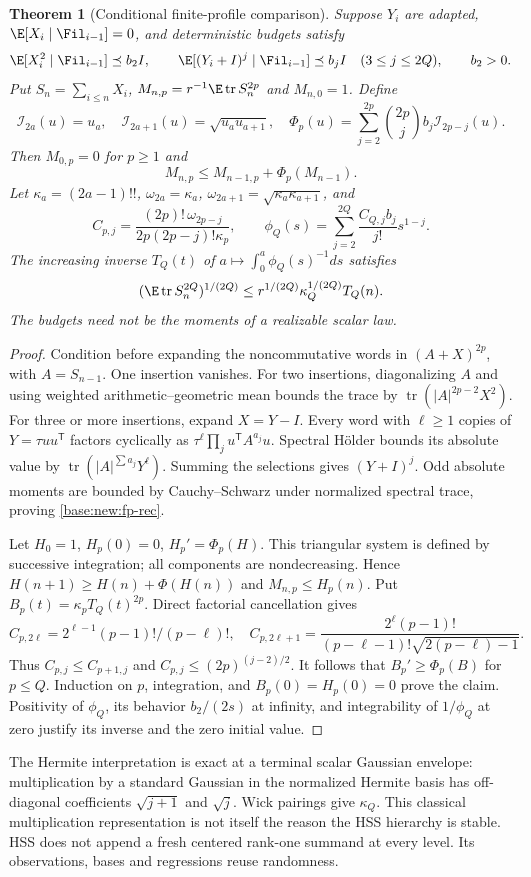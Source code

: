 \documentclass[11pt,oneside,openany,a4paper]{book}
\numberwithin{equation}{chapter}
\newtheorem{theorem}{Theorem}[chapter]
\theoremstyle{definition}
\theoremstyle{remark}
\newcommand{\T}{\mathsf T}\newcommand{\Id}{I}
\DeclareMathOperator{\tr}{tr}\DeclareMathOperator{\rank}{rank}
\begin{document}
\begin{theorem}[Conditional finite-profile comparison]\label{base:new:fp-thm}
Suppose $Y_i$ are adapted, $\E[X_i\mid\Fil_{i-1}]=0$, and deterministic budgets satisfy
\[
 \E[X_i^2\mid\Fil_{i-1}]\preceq b_2I,\qquad
 \E[(Y_i+I)^j\mid\Fil_{i-1}]\preceq b_jI\quad(3\le j\le2Q),
 \qquad b_2>0.
\]
Put $S_n=\sum_{i\le n}X_i$, $M_{n,p}=r^{-1}\E\tr S_n^{2p}$ and $M_{n,0}=1$. Define
\[
 \mathcal I_{2a}(u)=u_a,\quad \mathcal I_{2a+1}(u)=\sqrt{u_au_{a+1}},\quad
 \Phi_p(u)=\sum_{j=2}^{2p}\binom{2p}j b_j\mathcal I_{2p-j}(u).
\]
Then $M_{0,p}=0$ for $p\ge1$ and
\begin{equation}\label{base:new:fp-rec}
 M_{n,p}\le M_{n-1,p}+\Phi_p(M_{n-1}).
\end{equation}
Let $\kappa_a=(2a-1)!!$, $\omega_{2a}=\kappa_a$, $\omega_{2a+1}=\sqrt{\kappa_a\kappa_{a+1}}$, and
\[
 C_{p,j}=\frac{(2p)!\,\omega_{2p-j}}{2p(2p-j)!\kappa_p},\qquad
 \phi_Q(s)=\sum_{j=2}^{2Q}\frac{C_{Q,j}b_j}{j!}s^{1-j}.
\]
The increasing inverse $T_Q(t)$ of $a\mapsto\int_0^a\phi_Q(s)^{-1}ds$ satisfies
\begin{equation}\label{base:new:fp-int}
 (\E\tr S_n^{2Q})^{1/(2Q)}\le r^{1/(2Q)}\kappa_Q^{1/(2Q)}T_Q(n).
\end{equation}
The budgets need not be the moments of a realizable scalar law.
\end{theorem}
\begin{proof}
Condition before expanding the noncommutative words in $(A+X)^{2p}$, with $A=S_{n-1}$. One insertion vanishes. For two insertions, diagonalizing $A$ and using weighted arithmetic--geometric mean bounds the trace by $\tr(|A|^{2p-2}X^2)$. For three or more insertions, expand $X=Y-I$. Every word with $\ell\ge1$ copies of $Y=\tau uu^\T$ factors cyclically as $\tau^\ell\prod_j u^\T A^{a_j}u$. Spectral H\"older bounds its absolute value by $\tr(|A|^{\sum a_j}Y^\ell)$. Summing the selections gives $(Y+I)^j$. Odd absolute moments are bounded by Cauchy--Schwarz under normalized spectral trace, proving \eqref{base:new:fp-rec}.

Let $H_0=1$, $H_p(0)=0$, $H_p'=\Phi_p(H)$. This triangular system is defined by successive integration; all components are nondecreasing. Hence $H(n+1)\ge H(n)+\Phi(H(n))$ and $M_{n,p}\le H_p(n)$. Put $B_p(t)=\kappa_pT_Q(t)^{2p}$. Direct factorial cancellation gives
\[
 C_{p,2\ell}=2^{\ell-1}(p-1)!/(p-\ell)!,\quad
 C_{p,2\ell+1}=\frac{2^\ell(p-1)!}{(p-\ell-1)!\sqrt{2(p-\ell)-1}}.
\]
Thus $C_{p,j}\le C_{p+1,j}$ and $C_{p,j}\le(2p)^{(j-2)/2}$. It follows that $B_p'\ge\Phi_p(B)$ for $p\le Q$. Induction on $p$, integration, and $B_p(0)=H_p(0)=0$ prove the claim. Positivity of $\phi_Q$, its behavior $b_2/(2s)$ at infinity, and integrability of $1/\phi_Q$ at zero justify its inverse and the zero initial value.
\end{proof}
The Hermite interpretation is exact at a terminal scalar Gaussian envelope: multiplication by a standard Gaussian in the normalized Hermite basis has off-diagonal coefficients $\sqrt{j+1}$ and $\sqrt j$. Wick pairings give $\kappa_Q$. This classical multiplication representation is not itself the reason the HSS hierarchy is stable. HSS does not append a fresh centered rank-one summand at every level. Its observations, bases and regressions reuse randomness.
\end{document}
